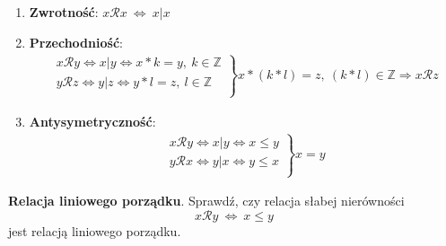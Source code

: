 \documentclass[main.tex]{subfiles}
\begin{document}
    \begin{enumerate}
        \item \textbf{Zwrotność}: $x \mathcal{R} x ~ \Leftrightarrow ~ x | x$
        \item \textbf{Przechodniość}:
        \begin{align*}
            \left.\begin{matrix}
                      x \mathcal{R} y \Leftrightarrow x|y \Leftrightarrow x*k = y, ~ k \in \mathbb{Z}\\
                      y \mathcal{R} z \Leftrightarrow y|z \Leftrightarrow y*l = z, ~ l \in \mathbb{Z}\\
            \end{matrix}\right\} x*(k*l) = z, ~ (k*l) \in \mathbb{Z} \Rightarrow x \mathcal{R} z
        \end{align*}
        \item \textbf{Antysymetryczność}:
        \begin{align*}
            \left.\begin{matrix}
                      x \mathcal{R} y \Leftrightarrow x|y \Leftrightarrow x \leq y\\
                      y \mathcal{R} x \Leftrightarrow y|x \Leftrightarrow y \leq x\\
            \end{matrix}\right\} x = y
        \end{align*}
    \end{enumerate}

    \begin{exercise}
        \textbf{Relacja liniowego porządku}. Sprawdź, czy relacja słabej nierówności
        \[ x \mathcal{R} y ~ \Leftrightarrow ~ x \leq y \]
        jest relacją liniowego porządku.
    \end{exercise}
\end{document}
